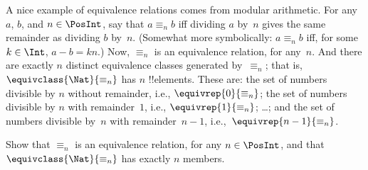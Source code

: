 \documentclass[../../../include/open-logic-section]{subfiles}
\begin{document}
\begin{ex}
A nice example of equivalence relations comes from modular arithmetic.
For any $a$, $b$, and $n \in \PosInt$, say that $a \equiv_n b$ iff
dividing $a$ by~$n$ gives the same remainder as dividing $b$ by~$n$.
(Somewhat more symbolically: $a \equiv_n b$ iff, for some $k \in
\Int$, $a - b = kn$.) Now, $\equiv_n$ is an equivalence relation, for
any~$n$. And there are exactly $n$ distinct equivalence classes
generated by~$\equiv_n$; that is, $\equivclass{\Nat}{\equiv_n}$ has
$n$ !!{element}s. These are: the set of numbers divisible by $n$
without remainder, i.e., $\equivrep{0}{\equiv_n}$; the set of numbers
divisible by $n$ with remainder~$1$, i.e., $\equivrep{1}{\equiv_n}$;
\ldots; and the set of numbers divisible by~$n$ with remainder~$n-1$,
i.e.,~$\equivrep{n-1}{\equiv_n}$.
\end{ex}

\begin{prob}
Show that $\equiv_n$ is an equivalence relation, for any $n \in
\PosInt$, and that $\equivclass{\Nat}{\equiv_n}$ has exactly $n$ members.
\end{prob}
\end{document}
